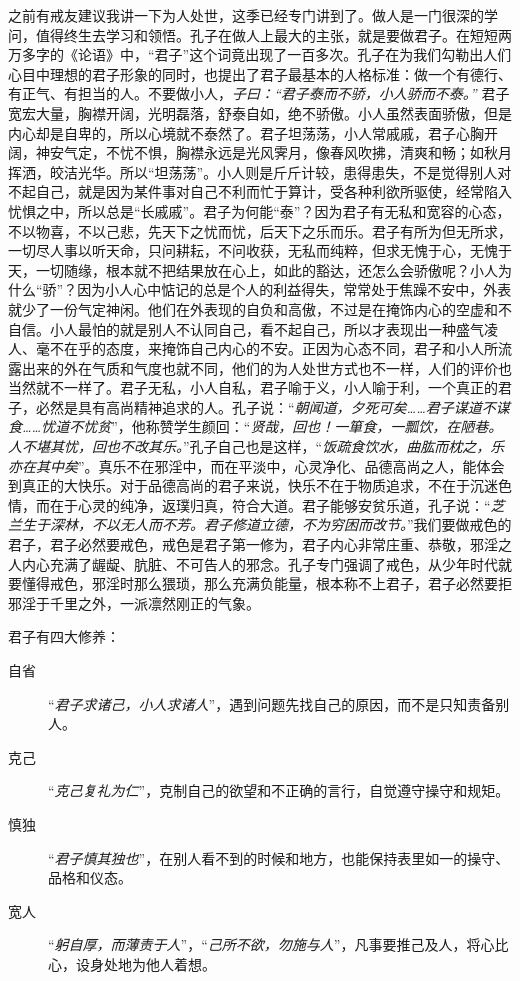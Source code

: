 之前有戒友建议我讲一下为人处世，这季已经专门讲到了。做人是一门很深的学问，值得终生去学习和领悟。孔子在做人上最大的主张，就是要做君子。在短短两万多字的《论语》中，“君子”这个词竟出现了一百多次。孔子在为我们勾勒出人们心目中理想的君子形象的同时，也提出了君子最基本的人格标准：做一个有德行、有正气、有担当的人。不要做小人，\textit{子曰：“君子泰而不骄，小人骄而不泰。”} 君子宽宏大量，胸襟开阔，光明磊落，舒泰自如，绝不骄傲。小人虽然表面骄傲，但是内心却是自卑的，所以心境就不泰然了。君子坦荡荡，小人常戚戚，君子心胸开阔，神安气定，不忧不惧，胸襟永远是光风霁月，像春风吹拂，清爽和畅；如秋月挥洒，皎洁光华。所以“坦荡荡”。小人则是斤斤计较，患得患失，不是觉得别人对不起自己，就是因为某件事对自己不利而忙于算计，受各种利欲所驱使，经常陷入忧惧之中，所以总是“长戚戚”。君子为何能“泰”？因为君子有无私和宽容的心态，不以物喜，不以己悲，先天下之忧而忧，后天下之乐而乐。君子有所为但无所求，一切尽人事以听天命，只问耕耘，不问收获，无私而纯粹，但求无愧于心，无愧于天，一切随缘，根本就不把结果放在心上，如此的豁达，还怎么会骄傲呢？小人为什么“骄”？因为小人心中惦记的总是个人的利益得失，常常处于焦躁不安中，外表就少了一份气定神闲。他们在外表现的自负和高傲，不过是在掩饰内心的空虚和不自信。小人最怕的就是别人不认同自己，看不起自己，所以才表现出一种盛气凌人、毫不在乎的态度，来掩饰自己内心的不安。正因为心态不同，君子和小人所流露出来的外在气质和气度也就不同，他们的为人处世方式也不一样，人们的评价也当然就不一样了。君子无私，小人自私，君子喻于义，小人喻于利，一个真正的君子，必然是具有高尚精神追求的人。孔子说：“\textit{朝闻道，夕死可矣……君子谋道不谋食……忧道不忧贫}”，他称赞学生颜回：“\textit{贤哉，回也！一箪食，一瓢饮，在陋巷。人不堪其忧，回也不改其乐。}”孔子自己也是这样，“\textit{饭疏食饮水，曲肱而枕之，乐亦在其中矣}”。真乐不在邪淫中，而在平淡中，心灵净化、品德高尚之人，能体会到真正的大快乐。对于品德高尚的君子来说，快乐不在于物质追求，不在于沉迷色情，而在于心灵的纯净，返璞归真，符合大道。君子能够安贫乐道，孔子说：“\textit{芝兰生于深林，不以无人而不芳。君子修道立德，不为穷困而改节。}”我们要做戒色的君子，君子必然要戒色，戒色是君子第一修为，君子内心非常庄重、恭敬，邪淫之人内心充满了龌龊、肮脏、不可告人的邪念。孔子专门强调了戒色，从少年时代就要懂得戒色，邪淫时那么猥琐，那么充满负能量，根本称不上君子，君子必然要拒邪淫于千里之外，一派凛然刚正的气象。

君子有四大修养：\begin{adjustwidth}{-1em}{-1em}
    \begin{description}
        \item[自省] “\textit{君子求诸己，小人求诸人}”，遇到问题先找自己的原因，而不是只知责备别人。
        \item[克己] “\textit{克己复礼为仁}”，克制自己的欲望和不正确的言行，自觉遵守操守和规矩。
        \item[慎独] “\textit{君子慎其独也}”，在别人看不到的时候和地方，也能保持表里如一的操守、品格和仪态。
        \item[宽人] “\textit{躬自厚，而薄责于人}”，“\textit{己所不欲，勿施与人}”，凡事要推己及人，将心比心，设身处地为他人着想。
    \end{description}
\end{adjustwidth}

